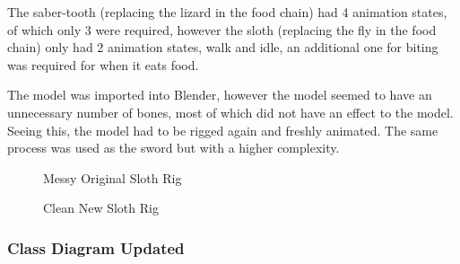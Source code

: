 \documentclass[11pt]{report}
\begin{document}
The saber-tooth (replacing the lizard in the food chain) had 4 animation states, of which only 3 were required, however the sloth (replacing the fly in the food chain) only had 2 animation states, walk and idle, an additional one for biting was required for when it eats food. 

The model was imported into Blender, however the model seemed to have an unnecessary number of bones, most of which did not have an effect to the model. Seeing this, the model had to be rigged again and freshly animated. The same process was used as the sword but with a higher complexity.



\begin{figure}[H]
    \begin{minipage}{.5\textwidth}
        \centering
        \caption{Messy Original Sloth Rig}
    \end{minipage}
    \begin{minipage}{.5\textwidth}
        \centering
        \caption{Clean New Sloth Rig}
    \end{minipage}
\end{figure}


\subsubsection{Class Diagram Updated}
\end{document}

